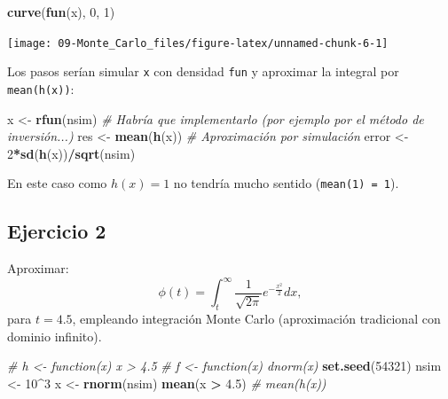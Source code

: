 \documentclass[]{book}
\newenvironment{Shaded}{\begin{snugshade}}{\end{snugshade}}
\newcommand{\KeywordTok}[1]{\textcolor[rgb]{0.13,0.29,0.53}{\textbf{#1}}}
\newcommand{\DecValTok}[1]{\textcolor[rgb]{0.00,0.00,0.81}{#1}}
\newcommand{\FloatTok}[1]{\textcolor[rgb]{0.00,0.00,0.81}{#1}}
\newcommand{\StringTok}[1]{\textcolor[rgb]{0.31,0.60,0.02}{#1}}
\newcommand{\CommentTok}[1]{\textcolor[rgb]{0.56,0.35,0.01}{\textit{#1}}}
\newcommand{\OperatorTok}[1]{\textcolor[rgb]{0.81,0.36,0.00}{\textbf{#1}}}
\newcommand{\NormalTok}[1]{#1}
\theoremstyle{definition}
\theoremstyle{definition}
\theoremstyle{definition}
\theoremstyle{remark}
\begin{document}
\begin{Shaded}
\begin{Highlighting}[]
\KeywordTok{curve}\NormalTok{(}\KeywordTok{fun}\NormalTok{(x), }\DecValTok{0}\NormalTok{, }\DecValTok{1}\NormalTok{)}
\end{Highlighting}
\end{Shaded}

\begin{center}\texttt{[image: 09-Monte\_Carlo\_files/figure-latex/unnamed-chunk-6-1]} \end{center}

Los pasos serían simular \texttt{x} con densidad \texttt{fun} y
aproximar la integral por \texttt{mean(h(x))}:

\begin{Shaded}
\begin{Highlighting}[]
\NormalTok{x <-}\StringTok{ }\KeywordTok{rfun}\NormalTok{(nsim) }\CommentTok{# Habría que implementarlo (por ejemplo por el método de inversión...)}
\NormalTok{res <-}\StringTok{ }\KeywordTok{mean}\NormalTok{(}\KeywordTok{h}\NormalTok{(x)) }\CommentTok{# Aproximación por simulación }
\NormalTok{error <-}\StringTok{ }\DecValTok{2}\OperatorTok{*}\KeywordTok{sd}\NormalTok{(}\KeywordTok{h}\NormalTok{(x))}\OperatorTok{/}\KeywordTok{sqrt}\NormalTok{(nsim)}
\end{Highlighting}
\end{Shaded}

En este caso como \(h(x) = 1\) no tendría mucho sentido
(\texttt{mean(1)\ =\ 1}).

\subsection{Ejercicio 2}\label{ejercicio-2}

Aproximar:
\[\phi(t)=\int_{t}^{\infty}\frac{1}{\sqrt{2\pi}}e^{-\frac{x^{2}}{2}}dx,\]
para \(t=4.5\), empleando integración Monte Carlo (aproximación
tradicional con dominio infinito).

\begin{Shaded}
\begin{Highlighting}[]
\CommentTok{# h <- function(x) x > 4.5}
\CommentTok{# f <- function(x) dnorm(x)}
\KeywordTok{set.seed}\NormalTok{(}\DecValTok{54321}\NormalTok{)}
\NormalTok{nsim <-}\StringTok{ }\DecValTok{10}\OperatorTok{^}\DecValTok{3}
\NormalTok{x <-}\StringTok{ }\KeywordTok{rnorm}\NormalTok{(nsim)}
\KeywordTok{mean}\NormalTok{(x }\OperatorTok{>}\StringTok{ }\FloatTok{4.5}\NormalTok{) }\CommentTok{# mean(h(x))}
\end{Highlighting}
\end{Shaded}
\end{document}
